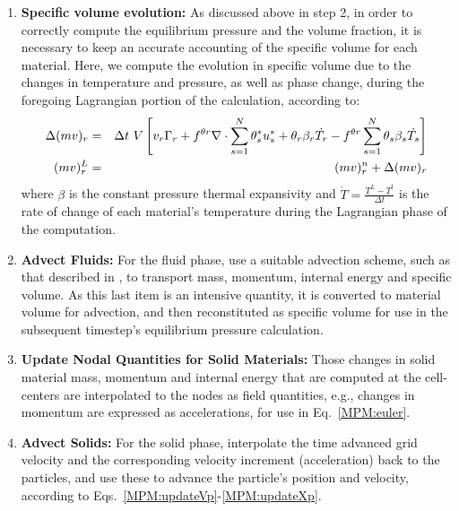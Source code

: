 \begin{enumerate}
\item {\bf Specific volume evolution:} As discussed above in step 2, in order to
correctly compute the equilibrium pressure and the volume fraction, it is necessary
to keep an accurate accounting of the specific volume for each material.  Here, 
we compute the evolution in specific volume due to the changes in temperature 
and pressure, as well as phase change, during the foregoing Lagrangian 
portion of the calculation, according to:
\begin{eqnarray}
  \Delta(mv)_r &=& \Delta t~ V 
     \left[ v_r \Gamma_r 
        + f^{\theta r} \nabla \cdot \sum\limits_{s=1}^N{\theta_s^*u_s^*}
               + \theta_r \beta_r \dot{T_r} 
        - f^{\theta r} \sum\limits_{s=1}^N{\theta_s \beta_s \dot{T_s}}\right]   
     \label{eqspvoldiscrete} \\
  (mv)_r^L &=& (mv)_r^n + \Delta(mv)_r \label{eqspvolLag}
\end{eqnarray}
where $\beta$ is the constant pressure thermal expansivity and
$\dot{T}=\frac{T^L - T^t}{\Delta{t}}$ is the rate of change of each material's
temperature during the Lagrangian phase of the computation.

\item {\bf Advect Fluids:} For the fluid phase, use a suitable advection scheme,
such as that described in \cite{Kashiwa1998}, to transport mass, momentum, internal energy 
and specific volume.  As this last item is an intensive quantity, it is converted
to material volume for advection, and then reconstituted as specific volume
for use in the subsequent timestep's equilibrium pressure calculation.

\item{\bf Update Nodal Quantities for Solid Materials:}  Those changes in 
solid material mass, momentum and internal energy that are computed at the 
cell-centers are interpolated to the nodes as field quantities, e.g., changes 
in momentum are expressed as accelerations, for use in Eq.~\ref{MPM:euler}.

\item {\bf Advect Solids:} For the solid phase, interpolate the time advanced
grid velocity and the corresponding velocity increment (acceleration) back 
to the particles, and use these to advance the particle's position and 
velocity, according to Eqs.~\ref{MPM:updateVp}-\ref{MPM:updateXp}.

\end{enumerate}

